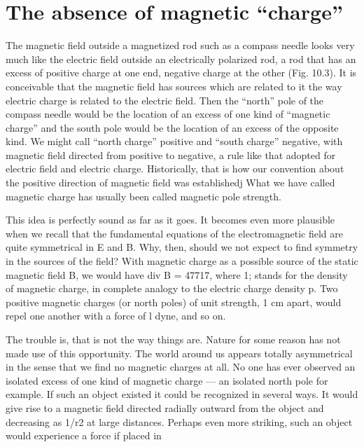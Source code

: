 
\iffalse

\section{The absence of magnetic ``charge''}

The magnetic field outside a magnetized rod such as a compass
needle looks very much like the electric field outside an electrically
polarized rod, a rod that has an excess of positive charge at one end,
negative charge at the other (Fig. 10.3). It is conceivable that the
magnetic field has sources which are related to it the way electric
charge is related to the electric field. Then the ``north'' pole of the
compass needle would be the location of an excess of one kind of
``magnetic charge'' and the south pole would be the location of an
excess of the opposite kind. We might call ``north charge'' positive
and ``south charge'' negative, with magnetic field directed from positive
to negative, a rule like that adopted for electric field and electric
charge. Historically, that is how our convention about the positive
direction of magnetic field was establishedj What we have called
magnetic charge has usually been called magnetic pole strength.

This idea is perfectly sound as far as it goes. It becomes even more
plausible when we recall that the fundamental equations of the electromagnetic
field are quite symmetrical in E and B. Why, then,
should we not expect to find symmetry in the sources of the field?
With magnetic charge as a possible source of the static magnetic
field B, we would have div B = 47717, where 1; stands for the density
of magnetic charge, in complete analogy to the electric charge
density p. Two positive magnetic charges (or north poles) of unit
strength, 1 cm apart, would repel one another with a force of l dyne,
and so on.

The trouble is, that is not the way things are. Nature for some
reason has not made use of this opportunity. The world around us
appears totally asymmetrical in the sense that we find no magnetic
charges at all. No one has ever observed an isolated excess of one
kind of magnetic charge --- an isolated north pole for example. If
such an object existed it could be recognized in several ways. It
would give rise to a magnetic field directed radially outward from
the object and decreasing as 1/r2 at large distances. Perhaps even
more striking, such an object would experience a force if placed in

